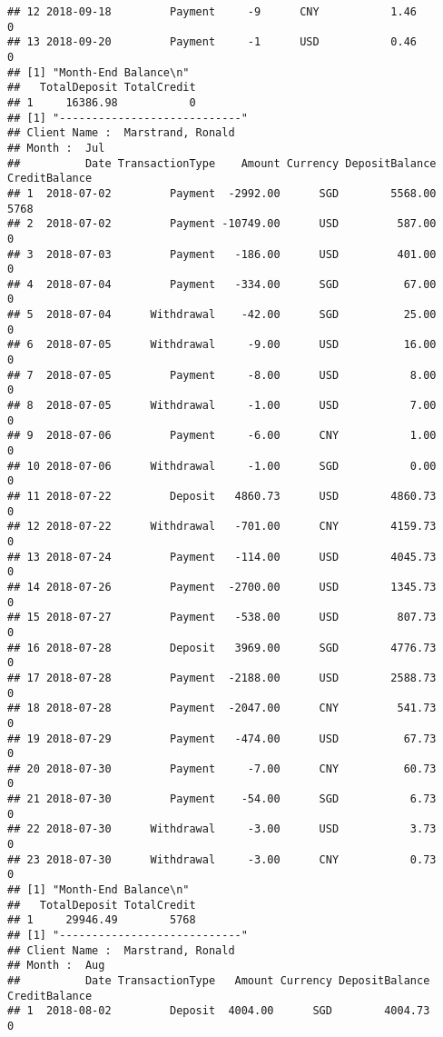 \documentclass[]{article}
\begin{document}
\begin{verbatim}
## 12 2018-09-18         Payment     -9      CNY           1.46             0
## 13 2018-09-20         Payment     -1      USD           0.46             0
## [1] "Month-End Balance\n"
##   TotalDeposit TotalCredit
## 1     16386.98           0
## [1] "----------------------------"
## Client Name :  Marstrand, Ronald 
## Month :  Jul 
##          Date TransactionType    Amount Currency DepositBalance CreditBalance
## 1  2018-07-02         Payment  -2992.00      SGD        5568.00          5768
## 2  2018-07-02         Payment -10749.00      USD         587.00             0
## 3  2018-07-03         Payment   -186.00      USD         401.00             0
## 4  2018-07-04         Payment   -334.00      SGD          67.00             0
## 5  2018-07-04      Withdrawal    -42.00      SGD          25.00             0
## 6  2018-07-05      Withdrawal     -9.00      USD          16.00             0
## 7  2018-07-05         Payment     -8.00      USD           8.00             0
## 8  2018-07-05      Withdrawal     -1.00      USD           7.00             0
## 9  2018-07-06         Payment     -6.00      CNY           1.00             0
## 10 2018-07-06      Withdrawal     -1.00      SGD           0.00             0
## 11 2018-07-22         Deposit   4860.73      USD        4860.73             0
## 12 2018-07-22      Withdrawal   -701.00      CNY        4159.73             0
## 13 2018-07-24         Payment   -114.00      USD        4045.73             0
## 14 2018-07-26         Payment  -2700.00      USD        1345.73             0
## 15 2018-07-27         Payment   -538.00      USD         807.73             0
## 16 2018-07-28         Deposit   3969.00      SGD        4776.73             0
## 17 2018-07-28         Payment  -2188.00      USD        2588.73             0
## 18 2018-07-28         Payment  -2047.00      CNY         541.73             0
## 19 2018-07-29         Payment   -474.00      USD          67.73             0
## 20 2018-07-30         Payment     -7.00      CNY          60.73             0
## 21 2018-07-30         Payment    -54.00      SGD           6.73             0
## 22 2018-07-30      Withdrawal     -3.00      USD           3.73             0
## 23 2018-07-30      Withdrawal     -3.00      CNY           0.73             0
## [1] "Month-End Balance\n"
##   TotalDeposit TotalCredit
## 1     29946.49        5768
## [1] "----------------------------"
## Client Name :  Marstrand, Ronald 
## Month :  Aug 
##          Date TransactionType   Amount Currency DepositBalance CreditBalance
## 1  2018-08-02         Deposit  4004.00      SGD        4004.73             0

\end{verbatim}
\end{document}
